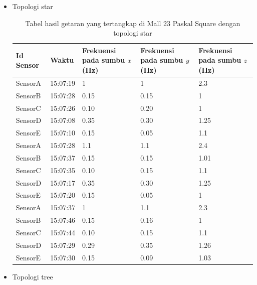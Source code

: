 \begin{itemize}
    \item Topologi star
    
    \begin{table}[H]
	\centering
	\caption{Tabel hasil getaran yang tertangkap di Mall 23 Paskal Square dengan topologi star}
	\label{star_paskal_tabel}
    	\begin{tabular}{|p{2cm}|p{2cm}|p{3cm}|p{3cm}|p{3cm}|}
    		\hline 
    		Id Sensor & Waktu & Frekuensi pada sumbu $x$ (Hz) & Frekuensi pada sumbu $y$ (Hz) & Frekuensi pada sumbu $z$ (Hz) \\
    		\hline
    		SensorA & 15:07:19 & 1 & 1 & 2.3 \\
    		\hline
    		SensorB & 15:07:28 & 0.15 & 0.15 & 1 \\
    		\hline
    		SensorC & 15:07:26 & 0.10 & 0.20 & 1 \\
    		\hline
    		SensorD & 15:07:08 & 0.35 & 0.30 & 1.25 \\
    		\hline
    		SensorE & 15:07:10 & 0.15 & 0.05 & 1.1 \\
    		\hline
    		SensorA & 15:07:28 & 1.1 & 1.1 & 2.4 \\
    		\hline
    		SensorB & 15:07:37 & 0.15 & 0.15 & 1.01 \\
    		\hline
    		SensorC & 15:07:35 & 0.10 & 0.15 & 1.1 \\
    		\hline
    		SensorD & 15:07:17 & 0.35 & 0.30 & 1.25 \\
    		\hline
    		SensorE & 15:07:20 & 0.15 & 0.05 & 1 \\
    		\hline
    		SensorA & 15:07:37 & 1 & 1.1 & 2.3 \\
    		\hline
    		SensorB & 15:07:46 & 0.15 & 0.16 & 1 \\
    		\hline
    		SensorC & 15:07:44 & 0.10 & 0.15 & 1.1 \\
    		\hline
    		SensorD & 15:07:29 & 0.29 & 0.35 & 1.26 \\
    		\hline
    		SensorE & 15:07:30 & 0.15 & 0.09 & 1.03 \\
    		\hline
    	\end{tabular}
    \end{table}
    
    \pagebreak
    \item Topologi tree
    

\end{itemize}
